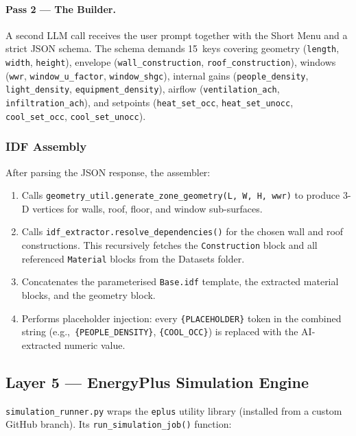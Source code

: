 \documentclass[12pt, a4paper]{article}
\begin{document}
\paragraph{Pass 2 --- The Builder.}
A second LLM call receives the user prompt together with the Short Menu and a strict JSON schema. The schema demands 15~keys covering geometry (\texttt{length}, \texttt{width}, \texttt{height}), envelope (\texttt{wall\_construction}, \texttt{roof\_construction}), windows (\texttt{wwr}, \texttt{window\_u\_factor}, \texttt{window\_shgc}), internal gains (\texttt{people\_density}, \texttt{light\_density}, \texttt{equipment\_density}), airflow (\texttt{ventilation\_ach}, \texttt{infiltration\_ach}), and setpoints (\texttt{heat\_set\_occ}, \texttt{heat\_set\_unocc}, \texttt{cool\_set\_occ}, \texttt{cool\_set\_unocc}).

\subsubsection{IDF Assembly}

After parsing the JSON response, the assembler:
\begin{enumerate}[nosep]
  \item Calls \texttt{geometry\_util.generate\_zone\_geometry(L, W, H, wwr)} to produce 3-D vertices for walls, roof, floor, and window sub-surfaces.
  \item Calls \texttt{idf\_extractor.resolve\_dependencies()} for the chosen wall and roof constructions. This recursively fetches the \texttt{Construction} block and all referenced \texttt{Material} blocks from the Datasets folder.
  \item Concatenates the parameterised \texttt{Base.idf} template, the extracted material blocks, and the geometry block.
  \item Performs placeholder injection: every \texttt{\{PLACEHOLDER\}} token in the combined string (e.g.,\ \texttt{\{PEOPLE\_DENSITY\}}, \texttt{\{COOL\_OCC\}}) is replaced with the AI-extracted numeric value.
\end{enumerate}

\subsection{Layer 5 --- EnergyPlus Simulation Engine}

\texttt{simulation\_runner.py} wraps the \texttt{eplus} utility library (installed from a custom GitHub branch). Its \texttt{run\_simulation\_job()} function:
\end{document}

